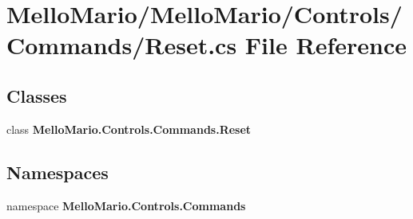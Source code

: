\section{Mello\+Mario/\+Mello\+Mario/\+Controls/\+Commands/\+Reset.cs File Reference}
\label{Reset_8cs}
\subsection*{Classes}
\begin{DoxyCompactItemize}
\item 
class \textbf{ Mello\+Mario.\+Controls.\+Commands.\+Reset}
\end{DoxyCompactItemize}
\subsection*{Namespaces}
\begin{DoxyCompactItemize}
\item 
namespace \textbf{ Mello\+Mario.\+Controls.\+Commands}
\end{DoxyCompactItemize}
